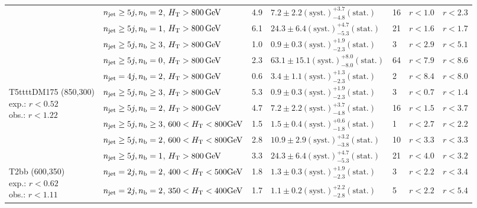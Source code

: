 \begin{table}[h!]
\begin{tabular}{ lllllll }
 & $n_{\mathrm{jet}} \geq5j,n_{\text{b}} =2$, $\mbox{$H_\text{T}$} > 800 \, \mathrm{GeV}$ & 4.9 & $7.2 \pm 2.2 \mathrm{(syst.)} ^{+3.7}_{-4.8} \mathrm{(stat.)}$ & 16 & $r < 1.0$ & $r < 2.3$\\ 
 & $n_{\mathrm{jet}} \geq5j,n_{\text{b}} =1$, $\mbox{$H_\text{T}$} > 800 \, \mathrm{GeV}$ & 6.1 & $24.3 \pm 6.4 \mathrm{(syst.)} ^{+4.7}_{-5.3} \mathrm{(stat.)}$ & 21 & $r < 1.6$ & $r < 1.7$\\ 
 & $n_{\mathrm{jet}} \geq5j,n_{\text{b}} \geq3$, $\mbox{$H_\text{T}$} > 800 \, \mathrm{GeV}$ & 1.0 & $0.9 \pm 0.3 \mathrm{(syst.)} ^{+1.9}_{-2.3} \mathrm{(stat.)}$ & 3 & $r < 2.9$ & $r < 5.1$\\ 
 & $n_{\mathrm{jet}} \geq5j,n_{\text{b}} =0$, $\mbox{$H_\text{T}$} > 800 \, \mathrm{GeV}$ & 2.3 & $63.1 \pm 15.1 \mathrm{(syst.)} ^{+8.0}_{-8.0} \mathrm{(stat.)}$ & 64 & $r < 7.9$ & $r < 8.6$\\ 
 & $n_{\mathrm{jet}} =4j,n_{\text{b}} =2$, $\mbox{$H_\text{T}$} > 800 \, \mathrm{GeV}$ & 0.6 & $3.4 \pm 1.1 \mathrm{(syst.)} ^{+1.3}_{-2.3} \mathrm{(stat.)}$ & 2 & $r < 8.4$ & $r < 8.0$\\ \hline
\multirow{5}{*}{\parbox[t]{2cm}{T5ttttDM175 (850,300)\\exp.: $r<0.52$\\obs.: $r<1.22$}}
 & $n_{\mathrm{jet}} \geq5j,n_{\text{b}} \geq3$, $\mbox{$H_\text{T}$} > 800 \, \mathrm{GeV}$ & 5.3 & $0.9 \pm 0.3 \mathrm{(syst.)} ^{+1.9}_{-2.3} \mathrm{(stat.)}$ & 3 & $r < 0.7$ & $r < 1.4$\\ 
 & $n_{\mathrm{jet}} \geq5j,n_{\text{b}} =2$, $\mbox{$H_\text{T}$} > 800 \, \mathrm{GeV}$ & 4.7 & $7.2 \pm 2.2 \mathrm{(syst.)} ^{+3.7}_{-4.8} \mathrm{(stat.)}$ & 16 & $r < 1.5$ & $r < 3.7$\\ 
 & $n_{\mathrm{jet}} \geq5j,n_{\text{b}} \geq3$, $600 < \mbox{$H_\text{T}$} < 800 \mathrm{GeV}$ & 1.5 & $1.5 \pm 0.4 \mathrm{(syst.)} ^{+0.6}_{-1.8} \mathrm{(stat.)}$ & 1 & $r < 2.7$ & $r < 2.2$\\ 
 & $n_{\mathrm{jet}} \geq5j,n_{\text{b}} =2$, $600 < \mbox{$H_\text{T}$} < 800 \mathrm{GeV}$ & 2.8 & $10.9 \pm 2.9 \mathrm{(syst.)} ^{+3.2}_{-3.8} \mathrm{(stat.)}$ & 10 & $r < 3.3$ & $r < 3.3$\\ 
 & $n_{\mathrm{jet}} \geq5j,n_{\text{b}} =1$, $\mbox{$H_\text{T}$} > 800 \, \mathrm{GeV}$ & 3.3 & $24.3 \pm 6.4 \mathrm{(syst.)} ^{+4.7}_{-5.3} \mathrm{(stat.)}$ & 21 & $r < 4.0$ & $r < 3.2$\\ \hline
\multirow{5}{*}{\parbox[t]{2cm}{T2bb (600,350)\\exp.: $r<0.62$\\obs.: $r<1.11$}}
 & $n_{\mathrm{jet}} =2j,n_{\text{b}} =2$, $400 < \mbox{$H_\text{T}$} < 500 \mathrm{GeV}$ & 1.8 & $1.3 \pm 0.3 \mathrm{(syst.)} ^{+1.9}_{-2.3} \mathrm{(stat.)}$ & 3 & $r < 2.2$ & $r < 3.4$\\ 
 & $n_{\mathrm{jet}} =2j,n_{\text{b}} =2$, $350 < \mbox{$H_\text{T}$} < 400 \mathrm{GeV}$ & 1.7 & $1.1 \pm 0.2 \mathrm{(syst.)} ^{+2.2}_{-2.8} \mathrm{(stat.)}$ & 5 & $r < 2.2$ & $r < 5.4$\\ 

\end{tabular}
\end{table}
